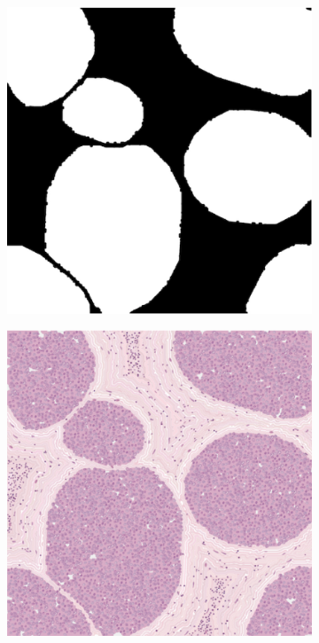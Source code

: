 \documentclass[12pt,a4paper]{report}
\begin{document}
    \begin{figure}[ht]
        \centering
        \begin{subfigure}[t]{0.3\textwidth}
             \centering
             \includegraphics[width = \textwidth]{images/morpho_mask}
             \caption{}
             \label{fig:morpho_mask}
        \end{subfigure}
        \quad
        \begin{subfigure}[t]{0.3\textwidth}
             \centering
             \includegraphics[width = \textwidth]{images/morpho_model}

\end{subfigure}
\end{figure}
\end{document}
